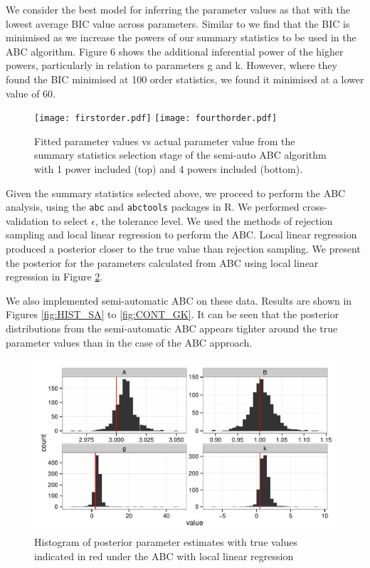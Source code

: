\documentclass[a4paper,10pt]{article}
\begin{document}
We consider the best model for inferring the parameter values as that with the lowest average BIC value across parameters. Similar to \cite{Fearnhead2012} we find that the BIC is minimised as we increase the powers of our summary statistics to be used in the ABC algorithm. Figure 6 shows the additional inferential power of  the higher powers, particularly in relation to parameters g and k. However, where they found the BIC minimised at 100 order statistics, we found it minimised at a lower value of 60.

\begin{figure}[h]
\label{fig:powers}
\texttt{[image: firstorder.pdf]}
\texttt{[image: fourthorder.pdf]}
\caption{Fitted parameter values vs actual parameter value from the summary statistics selection stage of the semi-auto ABC algorithm with 1 power included (top) and 4 powers included (bottom).}
\end{figure}



Given the summary statistics selected above, we proceed to perform the ABC analysis, using the \texttt{abc} and \texttt{abctools} packages in R.
We performed cross-validation to select $\epsilon$, the tolerance level. We used the methods of rejection sampling and local linear regression to perform the ABC. Local linear regression produced a posterior closer to the true value than rejection sampling. We present the posterior for the parameters calculated from  ABC using local linear regression in Figure \ref{fig:HIST}. 

We also implemented semi-automatic ABC on these data. Results are shown in Figures \ref{fig:HIST_SA} to \ref{fig:CONT_GK}. It can be seen that the posterior distributions from the semi-automatic ABC appears tighter around the true parameter values than in the case of the ABC approach.





\begin{figure}
\label{fig:HIST}
\includegraphics[width = \linewidth]{GK_REG_M_HIST.pdf}
\caption{Histogram of posterior parameter estimates with true values indicated in red under the ABC with local linear regression}
\end{figure}
\end{document}

